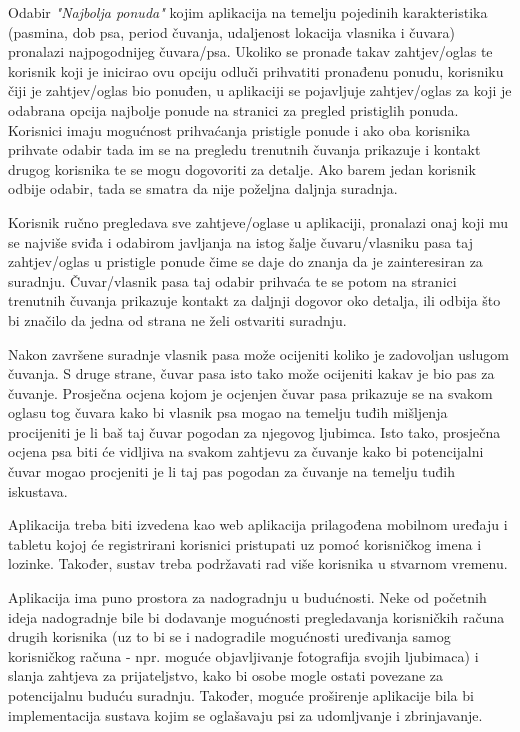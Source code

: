 		\begin{packed_item}
			
			\item Odabir \textit{"Najbolja ponuda"} kojim aplikacija na temelju pojedinih karakteristika (pasmina, dob psa, period čuvanja, udaljenost lokacija vlasnika i čuvara) pronalazi najpogodnijeg čuvara/psa. Ukoliko se pronađe takav zahtjev/oglas te korisnik koji je inicirao ovu opciju odluči prihvatiti pronađenu ponudu, korisniku čiji je zahtjev/oglas bio ponuđen, u aplikaciji se pojavljuje zahtjev/oglas za koji je odabrana opcija najbolje ponude na stranici za pregled pristiglih ponuda. Korisnici imaju mogućnost prihvaćanja pristigle ponude i ako oba korisnika prihvate odabir tada im se na pregledu trenutnih čuvanja prikazuje i kontakt drugog korisnika te se mogu dogovoriti za detalje. Ako barem jedan korisnik odbije odabir, tada se smatra da nije poželjna daljnja suradnja.
			\item Korisnik ručno pregledava sve zahtjeve/oglase u aplikaciji, pronalazi onaj koji mu se najviše sviđa i odabirom javljanja na istog šalje čuvaru/vlasniku pasa taj zahtjev/oglas u pristigle ponude čime se daje do znanja da je zainteresiran za suradnju. Čuvar/vlasnik pasa taj odabir prihvaća te se potom na stranici trenutnih čuvanja prikazuje kontakt za daljnji dogovor oko detalja, ili odbija što bi značilo da jedna od strana ne želi ostvariti suradnju.
			
		\end{packed_item}
		
		Nakon završene suradnje  vlasnik pasa može ocijeniti koliko je zadovoljan uslugom čuvanja. S druge strane, čuvar pasa isto tako može ocijeniti kakav je bio pas za čuvanje. Prosječna ocjena kojom je ocjenjen čuvar pasa prikazuje se na svakom oglasu tog čuvara kako bi vlasnik psa mogao na temelju tuđih mišljenja procijeniti je li baš taj čuvar pogodan za njegovog ljubimca. Isto tako, prosječna ocjena psa biti će vidljiva na svakom zahtjevu za čuvanje kako bi potencijalni čuvar mogao procjeniti je li taj pas pogodan za čuvanje na temelju tuđih iskustava.
		
		Aplikacija treba biti izvedena kao web aplikacija prilagođena mobilnom uređaju i tabletu kojoj će registrirani korisnici pristupati uz pomoć korisničkog imena i lozinke. Također, sustav treba podržavati rad više korisnika u stvarnom vremenu.\newline
		
		
		
		Aplikacija ima puno prostora za nadogradnju u budućnosti. Neke od početnih ideja nadogradnje bile bi 
		dodavanje mogućnosti pregledavanja korisničkih računa drugih korisnika (uz to bi se i nadogradile mogućnosti uređivanja samog korisničkog računa - npr. moguće objavljivanje fotografija svojih ljubimaca) i slanja zahtjeva za prijateljstvo, kako bi osobe mogle ostati povezane za potencijalnu buduću suradnju. Također, moguće proširenje aplikacije bila bi implementacija sustava kojim se oglašavaju psi za udomljvanje i zbrinjavanje.\newline
		

